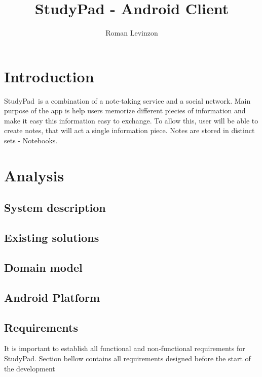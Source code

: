 \documentclass[thesis=B,english]{FITthesis}[2012/10/20]
\title{StudyPad - Android Client}
\author{Roman Levinzon} %
\newcommand{\appname}{StudyPad}
\begin{document}

\chapter{Introduction}


\appname\ is a combination of a note-taking service and a social network. Main purpose of the app is help users memorize different piecies  of information and make it easy this information easy to exchange.
To allow this, user will be able to create notes, that will act a single information piece. Notes are stored in distinct sets - Notebooks.

\chapter{Analysis}
\section{System description}
\section{Existing solutions}
\section{Domain model}
\section{Android Platform}

\newpage
\section{Requirements}
It is important to establish all functional and non-functional requirements for \appname. Section bellow contains all requirements designed before the start
of the development
\end{document}
